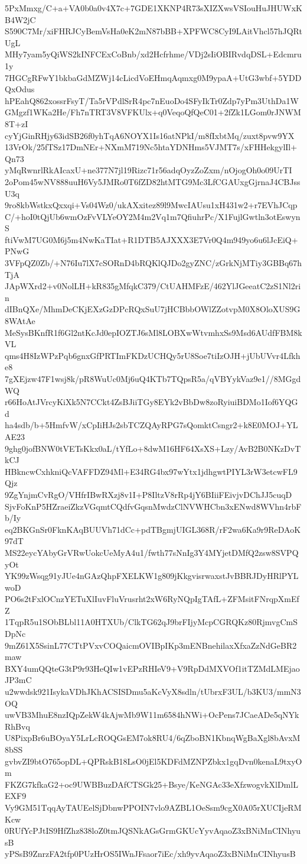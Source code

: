 5PxMmxg/C+a+VA0b0a0v4X7c+7GDE1XKNP4R73sXIZXwsVSIouHuJHUWxKB4W2jC
S590C7Mr/xiFHRJCyBemVsHa0eK2mN87bBB+XPFWC8CyI9LAitVhcl57hJQRtUgL
MHy7yam5yQiWS2kINFCExCoBnb/xd2Hcfrhme/VDj2sIiOBIRvdqDSL+Edcmru1y
7HGCgRFwY1bkbaGdMZWj14cLicdVoEHmqAqmxg0M9ypaA+UtG3wbf+5YDDQxOdus
hPEahQ862xossrFsyT/Ta5rVPdlSrR4pc7nEuoDo4SFyIkTr0Zdp7yPm3UthDa1W
GMgzf1WKa2He/Fh7nTRT3V8VFKUlx+q0VeqoQfQeC01+2fZk1LGom0rJNWM8T+zI
cyYjGinRHjy63idSB26f0yhTqA6NOYX1Is16atNPkI/m8fIxbtMq/zuxt8pvw9YX
13VrOk/25fTSz17DmNEr+NXmM719Nc5htaYDNHms5VJMT7s/xFHHekgylIl+Qn73
yMqRwnrlRkAIcaxU+ne377N7jl19Rizc71r56adqOyzZoZxm/nOjogOh0o09UrTI
2oPom45wNV888uuH6Vy5JMRo0T6fZD82htMTG9Mc3LfCGAUxgGjrnaJ4CBJssU3q
9ro8kbWstkxQxxqi+Vs04Wz0/ukAXxitez89l9MwcIAUsu1xH431w2+r7EVhJCqp
C/+hoI0tQjUb6wmOzFvVLYeOY2M4m2Vq1m7QfiuhrPc/X1FujlGwtln3otEswynS
ftiVwM7UG0M6j5m4NwKaTIat+R1DTB5AJXXX3E7Vr0Q4m949yo6u6lJcEiQ+PNwG
3VFpQZ0Zb/+N76Iu7lX7cSORnD4bRQKlQJDo2gyZNC/zGrkNjMTiy3GBBq67hTjA
JApWXrd2+v0NolLH+kR835gMfqkC379/CtUAHMFzE/462YlJGeeatC2zS1Nl2rin
dIBnQXe/MhmDeCKjEXzGzDPcRQxSuU7jHCBbbOWlZZotvpM0X8OloXUS9G8WAtAe
MeSysBKnfR1f6Gl2ntKcJd0epIOZTJ6sMl8LOBXwWtvmhxSs9Msd6AUdfFBM8kVL
qms4H8IzWPzPqb6gnxGfPRTImFKDzUCHQy5rU8Soe7tiIzOJH+jUbUVvr4Lfkhe8
7gXEjzw47F1wsj8k/pR8WuUc0Mj6uQ4KTb7TQpsR5a/qVBYykVaz9e1//8MGgdWQ
r66HoAtJVrcyKiXk5N7CCkt4ZsBJiiTGy8EYk2vBbDw8zoRyiuiBDMo1Iof6YQGd
ha4sdb/b+5HmfvW/xCpIiHJs2sbTCZQAyRPG7sQomktCsngr2+k8E0MOJ+YLAE23
9ghg0jofBNW0tVETsKkx0aL/tYfLo+8dwM16HF64XsXS+Lzy/AvB2B0NKzDvTkCJ
HBkncwCxhkniQcVAFFDZ94Ml+E34RG4bx97wYtx1jdhgwtPIYL3rW3etcwFL9Qjz
9ZgYnjmCvRgO/VHfrIBwRXzj8v1I+P8IltzV8rRp4jY6BIiiFEivjvDChJJ5cuqD
SjvFoKnP5HZraeiZkzVGqmtCQdfvGqsnMwdzClNVWHCbn3xENwd8WVhn4rbFb/Iy
eq2BKGnSr0FknKAqBUUVh71dCc+pdTBgmjUIGL368R/rF2wa6Ka9r9ReDAoK97dT
MS22eycYAbyGrVRwUokcUeMyA4u1/fwth77sNnIg3Y4MYjetDMfQ2zsw8SVPQyOt
YK99zWsqg91yJUe4nGAzQhpFXELKW1g809jKkgvisrwaxstJvBBRJDyHRlPYLwoD
PO6s2tFxlOCnzYETuXlIuvFluVrusrht2xW6RyNQpIgTAfL+ZFMsitFNrqpXmEfZ
1TqpR5u1SObBLbl11A0HTXUb/ClkTG62qJ9brFIjyMcpCGRQKz80RjmvgCmSDpNc
9mZ61X5SsinL77CTtPVxvCOQaicmOVIBpIKp3mENBnehilaxXfxaZzNdGeBR2maw
BXY4umQQteG3tP9r93HeQIw1vEPzRHIeV9+V9RpDdMXVOf1itTZMdLMEjaoJP3mC
u2wwdsk921IsykaVDhJKhACSISDmu5aKcVyX8sdln/tUbrxF3UL/b3KU3/mmN3OQ
uwVB3MhuE8nzIQpZekW4kAjwMb9W11m6584hNWi+OcPens7JCaeADe5qNYkRhBvq
U8PixpBr6uBOyaY5LrLcROQGsEM7ok8RU4/6qZboBN1KbnqWgBaXgl8bAvxM8bSS
gvbvZI9btO765opDL+QPRskB18LsO0jEl5KDFdMZNPZbkx1gqDvn0kenaL9txyOm
FKZG7kfkaG2+oc9UWBBuzDAfCTSGk25+Bsye/KeNGAc33eXfzwogvkXlDmlLEXF9
Vy9GM51TqqAyTAUEelSjDbnwPPOIN7vlo9AZBL1OeSsm9cgX0A05rXUCIjeRMKcw
0RUfYcPJtIS9HfZhz838loZ0tmJQSNkAGsGrmGKUcYyvAqaoZ3xBNiMnCINhyusB
yPSsB9ZnrzFA2tfp0PUzHrOS5IWnJFsaor7iEc/xh9yvAqaoZ3xBNiMnCINhyusB
